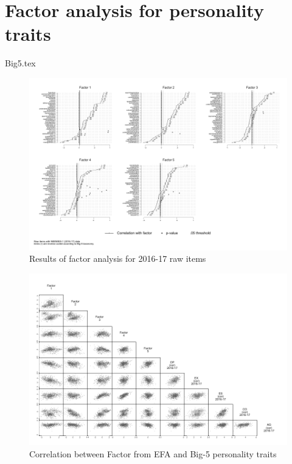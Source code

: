 \documentclass[a4paper, 11pt, onecolumn]{article}
\begin{document}
\clearpage
\newpage
\section{Factor analysis for personality traits}
\label{section:efa_big5}


{Big5.tex}

\clearpage
\begin{figure}[!htb]
\raggedright
\includegraphics[width=\textwidth, angle=0]{INPUT/factor2016_2}
\caption{Results of factor analysis for 2016-17 raw items}
\label{fig:resefa}
\end{figure}


\begin{figure}[!htb]
\raggedright
\includegraphics[scale=0.85]{INPUT/matrix_b5_efa}
\caption{Correlation between Factor from EFA and Big-5 personality traits}
\label{fig:descXY}
\end{figure}
\end{document}
